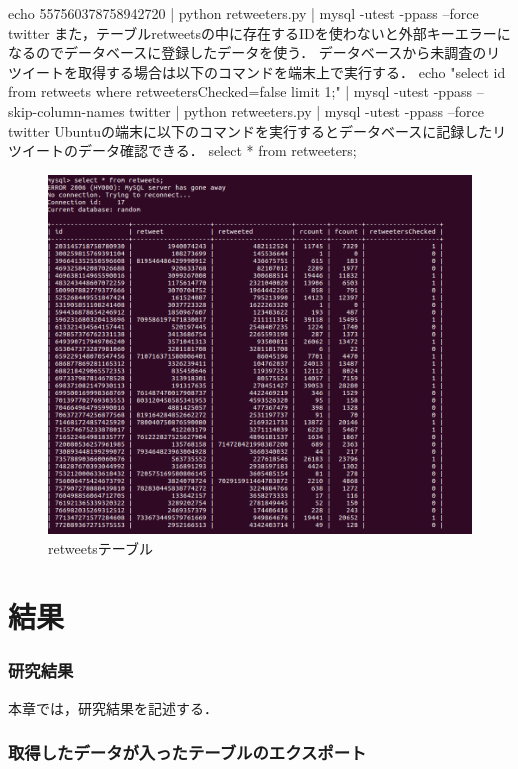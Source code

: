 echo 557560378758942720 | python retweeters.py | mysql -utest -ppass --force twitter
また，テーブルretweetsの中に存在するIDを使わないと外部キーエラーになるのでデータベースに登録したデータを使う．
\newline
データベースから未調査のリツイートを取得する場合は以下のコマンドを端末上で実行する．
\newline
echo "select id from retweets where retweetersChecked=false limit 1;" | mysql -utest -ppass --skip-column-names twitter | python retweeters.py | mysql -utest -ppass --force twitter
\newline
\newpage
Ubuntuの端末に以下のコマンドを実行するとデータベースに記録したリツイートのデータ確認できる．
select * from retweeters;
\newline
\begin{figure}[htb]
\centering
\includegraphics[width=13cm]{table_retweets.png}
\caption{retweetsテーブル}\label{table_retweets}
\end{figure}



\chapter{結果}
\subsection{研究結果}
本章では，研究結果を記述する．
   

\subsection{取得したデータが入ったテーブルのエクスポート}

